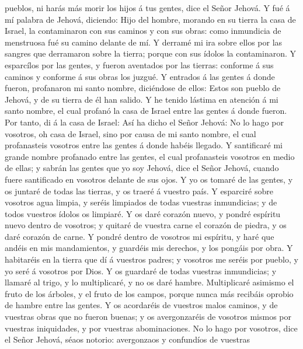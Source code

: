 pueblos, ni harás más morir los hijos á tus gentes, dice el Señor
Jehová.  Y fué á mí palabra de Jehová, diciendo:
 Hijo del hombre, morando en su tierra la casa de Israel,
la contaminaron con sus caminos y con sus obras: como inmundicia de
menstruosa fué su camino delante de mí.  Y derramé mi ira
sobre ellos por las sangres que derramaron sobre la tierra; porque con
sus ídolos la contaminaron.  Y esparcílos por las gentes,
y fueron aventados por las tierras: conforme á sus caminos y conforme á
sus obras los juzgué.  Y entrados á las gentes á donde
fueron, profanaron mi santo nombre, diciéndose de ellos: Estos son
pueblo de Jehová, y de su tierra de él han salido.  Y he
tenido lástima en atención á mi santo nombre, el cual profanó la casa de
Israel entre las gentes á donde fueron.  Por tanto, di á
la casa de Israel: Así ha dicho el Señor Jehová: No lo hago por
vosotros, oh casa de Israel, sino por causa de mi santo nombre, el cual
profanasteis vosotros entre las gentes á donde habéis llegado.
 Y santificaré mi grande nombre profanado entre las
gentes, el cual profanasteis vosotros en medio de ellas; y sabrán las
gentes que yo soy Jehová, dice el Señor Jehová, cuando fuere santificado
en vosotros delante de sus ojos.  Y yo os tomaré de las
gentes, y os juntaré de todas las tierras, y os traeré á vuestro país.
 Y esparciré sobre vosotros agua limpia, y seréis
limpiados de todas vuestras inmundicias; y de todos vuestros ídolos os
limpiaré.  Y os daré corazón nuevo, y pondré espíritu
nuevo dentro de vosotros; y quitaré de vuestra carne el corazón de
piedra, y os daré corazón de carne.  Y pondré dentro de
vosotros mi espíritu, y haré que andéis en mis mandamientos, y guardéis
mis derechos, y los pongáis por obra.  Y habitaréis en la
tierra que dí á vuestros padres; y vosotros me seréis por pueblo, y yo
seré á vosotros por Dios.  Y os guardaré de todas
vuestras inmundicias; y llamaré al trigo, y lo multiplicaré, y no os
daré hambre.  Multiplicaré asimismo el fruto de los
árboles, y el fruto de los campos, porque nunca más recibáis oprobio de
hambre entre las gentes.  Y os acordaréis de vuestros
malos caminos, y de vuestras obras que no fueron buenas; y os
avergonzaréis de vosotros mismos por vuestras iniquidades, y por
vuestras abominaciones.  No lo hago por vosotros, dice el
Señor Jehová, séaos notorio: avergonzaos y confundíos de vuestras
